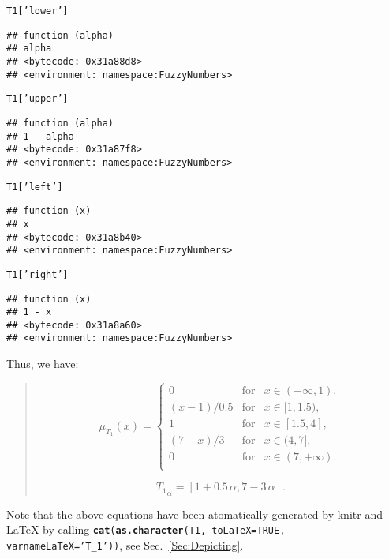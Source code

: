 \documentclass[11pt]{article}\usepackage{graphicx, color}
\makeatletter
\newcommand{\hlfunctioncall}[1]{\textcolor[rgb]{0.501960784313725,0,0.329411764705882}{\textbf{#1}}}%
\newcommand{\hlstring}[1]{\textcolor[rgb]{0.6,0.6,1}{#1}}%
\newcommand{\hlargument}[1]{\textcolor[rgb]{0.690196078431373,0.250980392156863,0.0196078431372549}{#1}}%
\newenvironment{kframe}{%
 \def\at@end@of@kframe{}%
 \ifinner\ifhmode%
  \def\at@end@of@kframe{\end{minipage}}%
  \begin{minipage}{\columnwidth}%
 \fi\fi%
 \def\FrameCommand##1{\hskip\@totalleftmargin \hskip-\fboxsep
 \colorbox{shadecolor}{##1}\hskip-\fboxsep
     \hskip-\linewidth \hskip-\@totalleftmargin \hskip\columnwidth}%
 \MakeFramed {\advance\hsize-\width
   \@totalleftmargin\z@ \linewidth\hsize
   \@setminipage}}%
 {\par\unskip\endMakeFramed%
 \at@end@of@kframe}
\newenvironment{knitrout}{}{} %
\newcommand{\package}[1]{\textsf{#1}\xspace}
\newcommand{\func}[1]{\texttt{\hlfunctioncall{#1}}}
\newcommand{\argument}[1]{\texttt{\hlargument{#1}}}
\newcommand{\str}[1]{\texttt{\hlstring{#1}}}
\makeatother
\begin{document}
\begin{knitrout}\small
{}\color{fgcolor}\begin{kframe}
\begin{alltt}
T1[\hlstring{'lower'}]
\end{alltt}
\begin{verbatim}
## function (alpha) 
## alpha
## <bytecode: 0x31a88d8>
## <environment: namespace:FuzzyNumbers>
\end{verbatim}
\begin{alltt}
T1[\hlstring{'upper'}]
\end{alltt}
\begin{verbatim}
## function (alpha) 
## 1 - alpha
## <bytecode: 0x31a87f8>
## <environment: namespace:FuzzyNumbers>
\end{verbatim}
\begin{alltt}
T1[\hlstring{'left'}]
\end{alltt}
\begin{verbatim}
## function (x) 
## x
## <bytecode: 0x31a8b40>
## <environment: namespace:FuzzyNumbers>
\end{verbatim}
\begin{alltt}
T1[\hlstring{'right'}]
\end{alltt}
\begin{verbatim}
## function (x) 
## 1 - x
## <bytecode: 0x31a8a60>
## <environment: namespace:FuzzyNumbers>
\end{verbatim}
\end{kframe}
\end{knitrout}



Thus, we have:
\begin{quote}
\[
\mu_{T_1}(x) = \left\{
\begin{array}{lll}
0      & \text{for} & x\in(-\infty,1), \\
(x-1)/0.5 & \text{for} & x\in[1,1.5), \\
1      & \text{for} & x\in[1.5,4], \\
(7-x)/3 & \text{for} & x\in(4,7], \\
0      & \text{for} & x\in(7,+\infty). \\
\end{array}
\right.
\]

\[
{T_1}_\alpha = [1+0.5\,\alpha, 7-3\,\alpha].
\]

\end{quote}

\noindent
Note that the above equations have been atomatically generated by \package{knitr}
and \LaTeX{} by
calling \texttt{\func{cat}(\func{as.character}(T1, \argument{toLaTeX=}TRUE, \argument{varnameLaTeX=}\str{'{}T\_1'{}}))},
see Sec.~\ref{Sec:Depicting}.
\end{document}
